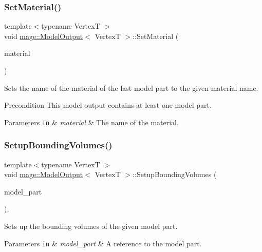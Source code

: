 \subsubsection{\texorpdfstring{Set\+Material()}{SetMaterial()}}
{\footnotesize\ttfamily template$<$typename VertexT $>$ \\
void \hyperlink{structmage_1_1_model_output}{mage\+::\+Model\+Output}$<$ VertexT $>$\+::Set\+Material (\begin{DoxyParamCaption}\item[{string}]{material }\end{DoxyParamCaption})}

Sets the name of the material of the last model part to the given material name.

\begin{DoxyPrecond}{Precondition}
This model output contains at least one model part. 
\end{DoxyPrecond}

\begin{DoxyParams}[1]{Parameters}
\mbox{\tt in}  & {\em material} & The name of the material. \\
\hline
\end{DoxyParams}
\hypertarget{structmage_1_1_model_output_aec05a0a43d141b8b8260e741314615c1}{}\label{structmage_1_1_model_output_aec05a0a43d141b8b8260e741314615c1} 
\subsubsection{\texorpdfstring{Setup\+Bounding\+Volumes()}{SetupBoundingVolumes()}}
{\footnotesize\ttfamily template$<$typename VertexT $>$ \\
void \hyperlink{structmage_1_1_model_output}{mage\+::\+Model\+Output}$<$ VertexT $>$\+::Setup\+Bounding\+Volumes (\begin{DoxyParamCaption}\item[{\hyperlink{structmage_1_1_model_part}{Model\+Part} \&}]{model\+\_\+part }\end{DoxyParamCaption})\hspace{0.3cm}{\ttfamily [private]}, {\ttfamily [noexcept]}}

Sets up the bounding volumes of the given model part.


\begin{DoxyParams}[1]{Parameters}
\mbox{\tt in}  & {\em model\+\_\+part} & A reference to the model part. \\
\hline
\end{DoxyParams}
\hypertarget{structmage_1_1_model_output_a833c8e380e2812ab0ca2853bb915e75f}{}\label{structmage_1_1_model_output_a833c8e380e2812ab0ca2853bb915e75f} 
